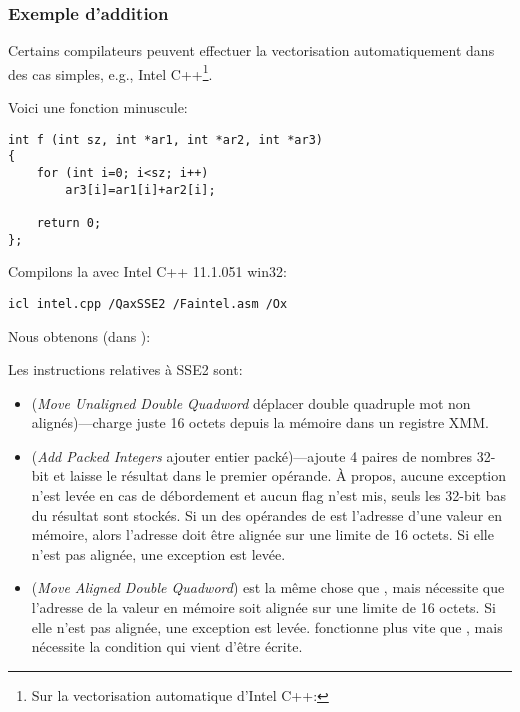 \subsubsection{Exemple d'addition}


Certains compilateurs peuvent effectuer la vectorisation automatiquement dans des
cas simples, e.g., Intel C++\footnote{Sur la vectorisation automatique d'Intel C++:
\URLINTELVEC}.

Voici une fonction minuscule:

\begin{lstlisting}[style=customc]
int f (int sz, int *ar1, int *ar2, int *ar3)
{
	for (int i=0; i<sz; i++)
		ar3[i]=ar1[i]+ar2[i];

	return 0;
};
\end{lstlisting}


Compilons la avec Intel C++ 11.1.051 win32:

\begin{verbatim}
icl intel.cpp /QaxSSE2 /Faintel.asm /Ox
\end{verbatim}

Nous obtenons (dans \IDA):



Les instructions relatives à SSE2 sont:
\begin{itemize}
\item
\MOVDQU (\emph{Move Unaligned Double Quadword} déplacer double quadruple mot non
alignés)---charge juste 16 octets depuis la mémoire dans un registre XMM.

\item
\PADDD (\emph{Add Packed Integers} ajouter entier packé)---ajoute 4 paires de nombres
32-bit et laisse le résultat dans le premier opérande.
À propos, aucune exception n'est levée en cas de débordement et aucun flag n'est mis,
seuls les 32-bit bas du résultat sont stockés.
Si un des opérandes de \PADDD est l'adresse d'une valeur en mémoire, alors l'adresse
doit être alignée sur une limite de 16 octets.
Si elle n'est pas alignée, une exception est levée.

\item
\MOVDQA (\emph{Move Aligned Double Quadword}) est la même chose que \MOVDQU, mais nécessite
que l'adresse de la valeur en mémoire soit alignée sur une limite de 16 octets. Si
elle n'est pas alignée, une exception est levée.
\MOVDQA fonctionne plus vite que \MOVDQU, mais nécessite la condition qui vient d'être
écrite.

\end{itemize}

